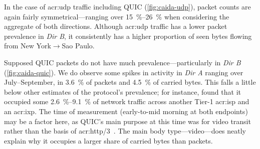 In the case of \gls{acr:udp} traffic including QUIC (\cref{fig:caida-udp}), packet counts are again fairly symmetrical---ranging over \qtyrange{15}{26}{\percent} when considering the aggregate of both directions.
Although \gls{acr:udp} traffic has a lower packet prevalence in \emph{Dir B}, it consistently has a higher proportion of seen bytes flowing from New York$\rightarrow$Sao Paulo.

Supposed QUIC packets do not have much prevalence---particularly in \emph{Dir B}
(\cref{fig:caida-quic}).
We do observe some spikes in activity in \emph{Dir A} ranging over July--September, in \qty{3.6}{\percent} of packets and \qty{4.5}{\percent} of carried bytes.
This falls a little below other estimates of the protocol's prevalence; for instance, \Textcite{DBLP:conf/pam/RuthPDH18} found that it occupied some \qtyrange{2.6}{9.1}{\percent} of network traffic across another Tier-1 \gls{acr:isp} and an \gls{acr:ixp}.
The time of measurement (early-to-mid morning at both endpoints) may be a factor here, as QUIC's main purpose at this time was for video transit rather than the basis of \gls{acr:http}/3~\parencite{ietf-quic-http-34}.
The main body type---video---does neatly explain why it occupies a larger share of carried bytes than packets.

\newlength{\caidafig}
\setlength{\caidafig}{1.0\linewidth}

